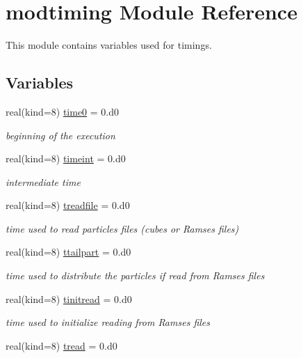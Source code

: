 \hypertarget{namespacemodtiming}{}\section{modtiming Module Reference}
\label{namespacemodtiming}


This module contains variables used for timings.  


\subsection*{Variables}
\begin{DoxyCompactItemize}
\item 
real(kind=8) \hyperlink{namespacemodtiming_aa15cbf8a08e28c5209481b3ed5f11090}{time0} = 0.d0
\begin{DoxyCompactList}\small\item\em beginning of the execution \end{DoxyCompactList}\item 
real(kind=8) \hyperlink{namespacemodtiming_a724cb127b8168bf0645e4070d83a34c0}{timeint} = 0.d0
\begin{DoxyCompactList}\small\item\em intermediate time \end{DoxyCompactList}\item 
real(kind=8) \hyperlink{namespacemodtiming_ab585192644ed79fc1030fde80dd84f85}{treadfile} = 0.d0
\begin{DoxyCompactList}\small\item\em time used to read particles files (cubes or Ramses files) \end{DoxyCompactList}\item 
real(kind=8) \hyperlink{namespacemodtiming_a65a8925f0685c0a5c5e42b0afd3b4a69}{ttailpart} = 0.d0
\begin{DoxyCompactList}\small\item\em time used to distribute the particles if read from Ramses files \end{DoxyCompactList}\item 
real(kind=8) \hyperlink{namespacemodtiming_a6c37469e0c299e5eb7c4b21eec1f2405}{tinitread} = 0.d0
\begin{DoxyCompactList}\small\item\em time used to initialize reading from Ramses files \end{DoxyCompactList}\item 
real(kind=8) \hyperlink{namespacemodtiming_ab77d3fc2a7e3da662677204c1c8f7e84}{tread} = 0.d0

\end{DoxyCompactItemize}
